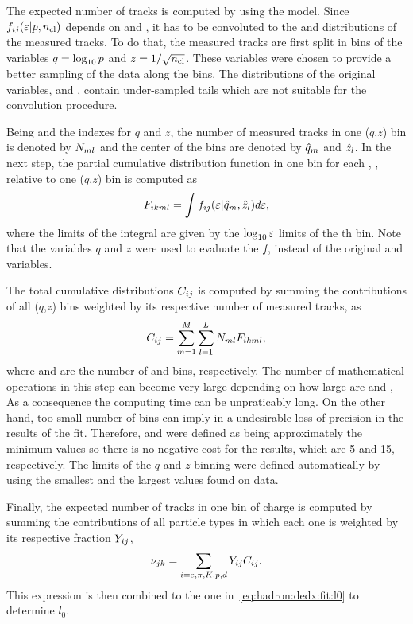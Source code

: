 The expected number of tracks is computed by using
the \eps model. Since $f_{ij}(\mbox{$\varepsilon$}|p,\mbox{$n_{\text{cl}}$})$ depends on \pp and \ncl,
it has to be convoluted to the \pp and \ncl distributions
of the measured tracks.
To do that, the measured tracks are first split in
bins of the variables $q = \log_{10}p$ and $z = 1/\sqrt{\mbox{$n_{\text{cl}}$}}$.
These variables were chosen to provide a better sampling
of the data along the bins. The distributions of the
original variables, \pp and \ncl, contain under-sampled
tails which are not suitable for the convolution procedure.

Being \iq and \iz the indexes for $q$ and $z$, the
number of measured tracks in one ($q$,$z$) bin is denoted
by $N_{ml}$ and the center of the bins are denoted
by $\hat{q}_{m}$ and $\hat{z}_{l}$. In the next step, the partial
cumulative distribution function in one \ieps bin for each \ipart, \ich,
relative to one ($q$,$z$) bin is computed as
\begin{equation}
  F_{ikml} = \int f_{ij}(\mbox{$\varepsilon$}|\hat{q}_{m},\hat{z}_{l}) d\mbox{$\varepsilon$},
\end{equation}
where the limits of the integral are given by the $\log_{10}\mbox{$\varepsilon$}$
limits of the {\ieps}th bin. Note that the variables $q$ and $z$
were used to evaluate the $f$,
instead of the original \pp and \ncl variables.

The total cumulative distributions $C_{ij}$ is computed by summing
the contributions of all ($q$,$z$) bins weighted by its respective
number of measured tracks, as
\begin{equation}
  C_{ij} = \sum_{m=1}^{M} \sum_{l=1}^{L} N_{ml} F_{ikml},
\end{equation}
where \nq and \nz are the number of \iq and \iz bins, respectively.
The number of mathematical operations in this step
can become very large depending on how large are \nq and \nz,
As a consequence the computing time can be unpraticably long.
On the other hand,
too small number of bins can imply in a undesirable loss of precision
in the results of the fit. Therefore, \nq and \nz were defined
as being approximately the minimum values so there is no negative cost
for the results, which are 5 and 15, respectively.
The limits of the $q$ and $z$ binning were defined automatically
by using the smallest and the largest values found on data.

Finally, the expected number of tracks in one \ieps bin of charge \ich
is computed by summing the contributions of all particle types
in which each one is weighted by its respective fraction $Y_{ij}$,
\begin{equation}
  \nu_{jk} = \sum_{i=e,\pi,K,p,d} Y_{ij} C_{ij}.
  \label{eq:hadron:dedx:fit:exp}
\end{equation}
This expression is then combined to the one in~\cref{eq:hadron:dedx:fit:l0}
to determine $l_0$.

